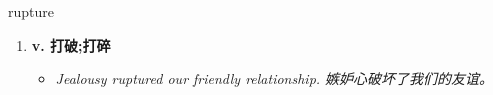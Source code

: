 
\begin{frame}
{\huge rupture}
\begin{center}
\begin{enumerate}\Large
  \item \textbf{v. 打破;打碎}
  \begin{itemize}
    \item \em{\Large{Jealousy ruptured our friendly relationship. 嫉妒心破坏了我们的友谊。}}
  \end{itemize}
\end{enumerate}
\end{center}
\end{frame}
